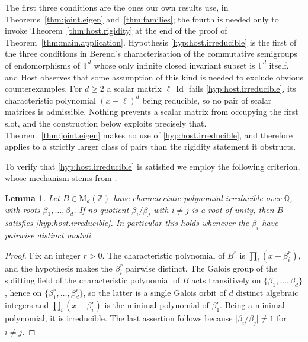 \documentclass[11pt,reqno]{amsart}
\theoremstyle{plain}
\newtheorem{lem}[thm]{Lemma}
\theoremstyle{definition}
\newcommand{\T}{\mathbb{T}}
\newcommand{\Z}{\mathbb{Z}}
\newcommand{\Q}{\mathbb{Q}}
\DeclareMathOperator{\Id}{Id}
\begin{document}
The first three conditions are the ones our own results use, in Theorems~\ref{thm:joint.eigen} and~\ref{thm:families}; the fourth is needed only to invoke Theorem~\ref{thm:host.rigidity} at the end of the proof of Theorem~\ref{thm:main.application}.
Hypothesis \ref{hyp:host.irreducible} is the first of the three conditions in Berend's characterisation \cite[Theorem 2.1]{berend_multi_1983} of the commutative semigroups of endomorphisms of \( \T^d \) whose only infinite closed invariant subset is \( \T^d \) itself, and Host observes \cite[\S1.2.2]{host_uniform_2000} that some assumption of this kind is needed to exclude obvious counterexamples.
For \( d\ge2 \) a scalar matrix \( \ell\,\Id \) fails \ref{hyp:host.irreducible}, its characteristic polynomial \( (x-\ell)^d \) being reducible, so no pair of scalar matrices is admissible.
Nothing prevents a scalar matrix from occupying the first slot, and the construction below exploits precisely that.
Theorem~\ref{thm:joint.eigen} makes no use of \ref{hyp:host.irreducible}, and therefore applies to a strictly larger class of pairs than the rigidity statement it obstructs.

To verify that \ref{hyp:host.irreducible} is satisfied we employ the following criterion, whose mechanism stems from \cite[\S6]{berend_multi_1983}.

\begin{lem}
\label{lem:irreducibility.criterion}
    Let \( B\in\mathrm M_d(\Z) \) have characteristic polynomial irreducible over \( \Q \), with roots \( \beta_1,\dots,\beta_d \).
    If no quotient \( \beta_i/\beta_j \) with \( i\neq j \) is a root of unity, then \( B \) satisfies \ref{hyp:host.irreducible}.
    In particular this holds whenever the \( \beta_i \) have pairwise distinct moduli.
\end{lem}

\begin{proof}
    Fix an integer \( r>0 \).
    The characteristic polynomial of \( B^r \) is \( \prod_i(x-\beta_i^r) \), and the hypothesis makes the \( \beta_i^r \) pairwise distinct.
    The Galois group of the splitting field of the characteristic polynomial of \( B \) acts transitively on \( \{\beta_1,\dots,\beta_d\} \), hence on \( \{\beta_1^r,\dots,\beta_d^r\} \), so the latter is a single Galois orbit of \( d \) distinct algebraic integers and \( \prod_i(x-\beta_i^r) \) is the minimal polynomial of \( \beta_1^r \).
    Being a minimal polynomial, it is irreducible.
    The last assertion follows because \( \lvert\beta_i/\beta_j\rvert\neq1 \) for \( i\neq j \).
\end{proof}
\end{document}
